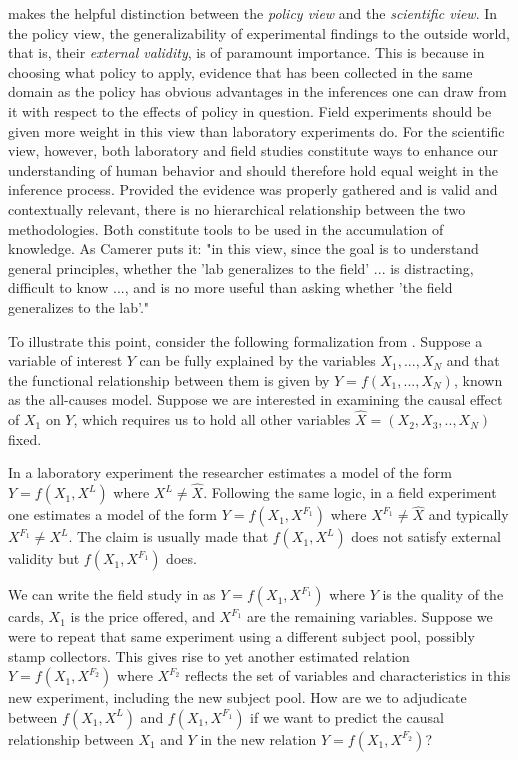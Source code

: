 \documentclass[12pt]{article}
\begin{document}
\cite{camerer2011promise} makes the helpful distinction between the \textit{policy view} and the \textit{scientific view}. In the policy view, the generalizability of experimental findings to the outside world, that is, their \textit{external validity}, is of paramount importance. This is because in choosing what policy to apply, evidence that has been collected in the same domain as the policy has obvious advantages in the inferences one can draw from it with respect to the effects of policy in question. Field experiments should be given more weight in this view than laboratory experiments do. For the scientific view, however, both laboratory and field studies constitute  ways to enhance our understanding of human behavior and should therefore hold equal weight in the inference process. Provided the evidence was properly gathered and is valid and contextually relevant, there is no hierarchical relationship between the two methodologies. Both constitute tools to be used in the accumulation of knowledge. As Camerer puts it: "in this view, since the goal is to understand general principles, whether the 'lab generalizes to the field' ... is distracting, difficult to know ..., and is no more useful than asking whether 'the field generalizes to the lab'."

To illustrate this point, consider the following formalization from \cite{Falk2009}. Suppose a variable of interest $Y$ can be fully explained by the variables $X_1,...,X_N$ and that the functional relationship between them is given by $Y=f\left(X_1,...,X_N\right)$, known as the all-causes model. Suppose we are interested in examining the causal effect of $X_1$ on $Y$, which requires us to hold all other variables $\hat{X} = \left(X_2,X_3,.., X_N\right)$ fixed.

In a laboratory experiment the researcher estimates a model of the form $Y=f\left(X_1,X^L\right)$ where $X^L \neq \hat{X}$. Following the same logic, in a field experiment one estimates a model of the form $Y=f\left(X_1,X^{F_1}\right)$ where $X^{F_1} \neq \hat{X}$ and typically $X^{F_1} \neq X^L$. The claim is usually made that $f\left(X_1,X^L\right)$ does not satisfy external validity but $f\left(X_1,X^{F_1}\right)$ does.

We can write the field study in \cite{List2006} as $Y=f\left(X_1,X^{F_1}\right)$ where $Y$ is the quality of the cards, $X_1$ is the price offered, and $X^{F_1}$ are the remaining variables. Suppose we were to repeat that same experiment using a different subject pool, possibly stamp collectors. This gives rise to yet another estimated relation $Y=f\left(X_1,X^{F_2}\right)$ where $X^{F_2}$ reflects the set of variables and characteristics in this new experiment, including the new subject pool. How are we to adjudicate between $f(X_1,X^L)$ and $f(X_1,X^{F_1})$ if we want to predict the causal relationship between $X_1$ and $Y$ in the new relation $Y=f\left(X_1,X^{F_2}\right)$?
\end{document}
